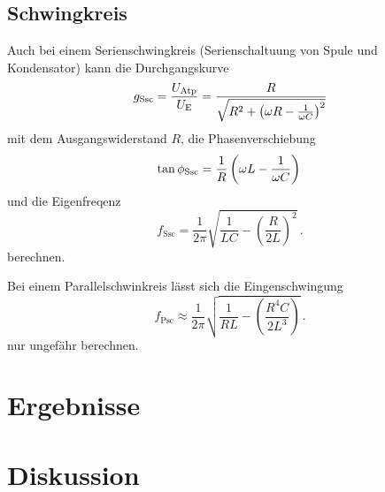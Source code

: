 \documentclass[11pt, a4paper]{article}
\begin{document}
    \subsection{Schwingkreis}
    Auch bei einem Serienschwingkreis (Serienschaltuung von Spule und Kondensator) kann die Durchgangskurve
    \begin{equation}
        g_{\text{Ssc}} = \frac{U_{\text{Atp}}}{U_{\text{E}}} = \frac{R}{\sqrt{R^2 + \left( \omega R - \frac{1}{\omega C} \right)^2}} \\
    \end{equation}
    mit dem Ausgangswiderstand $R$, die Phasenverschiebung
    \begin{equation}
        \tan{\phi_{\text{Ssc}}} = \frac{1}{R}\left( \omega L - \frac{1}{\omega C} \right) \\
    \end{equation}
    und die Eigenfreqenz
    \begin{equation}
        f_{\text{Ssc}} = \frac{1}{2 \pi} \sqrt{\frac{1}{L C} - \left(\frac{R}{2L}\right)^2} \,.
    \end{equation}
    berechnen.

    Bei einem Parallelschwinkreis lässt sich die Eingenschwingung
    \begin{equation}
        f_{\text{Psc}} \approx \frac{1}{2 \pi} \sqrt{\frac{1}{R L} - \left(\frac{R^4 C}{2L^3}\right)} \,.
    \end{equation}
    nur ungefähr berechnen.
    


    \section{Ergebnisse}

    \section{Diskussion}

    
    
\end{document}
